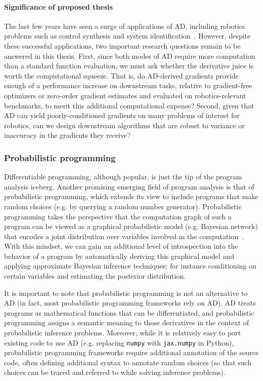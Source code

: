 \paragraph{Significance of proposed thesis} The last few years have seen a surge of applications of AD, including robotics problems such as control synthesis and system identification~\cite{xuAcceleratedPolicyLearning2022,agrawalDifferentiableConvexOptimization2019,amosOptNetDifferentiableOptimization2017,belubute_peres_lcp_physics,du2021underwater}. However, despite these successful applications, two important research questions remain to be answered in this thesis. First, since both modes of AD require more computation than a standard function evaluation, we must ask whether the derivative juice is worth the computational squeeze. That is, do AD-derived gradients provide enough of a performance increase on downstream tasks, relative to gradient-free optimizers or zero-order gradient estimates and evaluated on robotics-relevant benchmarks, to merit this additional computational expense? Second, given that AD can yield poorly-conditioned gradients on many problems of interest for robotics, can we design downstream algorithms that are robust to variance or inaccuracy in the gradients they receive?

\subsubsection{Probabilistic programming}

Differentiable programming, although popular, is just the tip of the program analysis iceberg. Another promising emerging field of program analysis is that of probabilistic programming, which extends its view to include programs that make random choices (e.g. by querying a random number generator). Probabilistic programming takes the perspective that the computation graph of such a program can be viewed as a graphical probabilistic model (e.g. Bayesian network) that encodes a joint distribution over variables involved in the computation~\cite{woodNewApproachProbabilistic2014}. With this mindset, we can gain an additional level of introspection into the behavior of a program by automatically deriving this graphical model and applying approximate Bayesian inference techniques; for instance conditioning on certain variables and estimating the posterior distribution.

It is important to note that probabilistic programming is not an alternative to AD (in fact, most probabilistic programming frameworks rely on AD). AD treats programs as mathematical functions that can be differentiated, and probabilistic programming assigns a semantic meaning to those derivatives in the context of probabilistic inference problems. Moreover, while it is relatively easy to port existing code to use AD (e.g. replacing \texttt{numpy} with \texttt{jax.numpy} in Python), probabilistic programming frameworks require additional annotation of the source code, often defining additional syntax to annotate random choices (so that such choices can be traced and referred to while solving inference problems).

